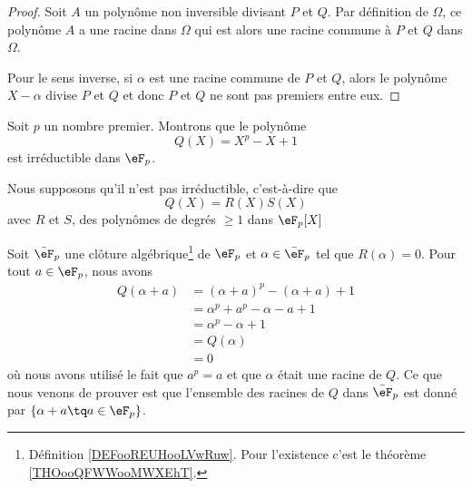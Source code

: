 \begin{proof}
    Soit \( A\) un polynôme non inversible divisant \( P\) et $Q$. Par définition de \( \Omega\), ce polynôme \( A\) a une racine dans \( \Omega\) qui est alors une racine commune à \( P\) et \( Q\) dans \( \Omega\).

    Pour le sens inverse, si \( \alpha\) est une racine commune de \( P\) et \( Q\), alors le polynôme \( X-\alpha\) divise \( P\) et \( Q\) et donc \( P\) et \( Q \) ne sont pas premiers entre eux.
\end{proof}

\begin{example}     \label{ExfUqQXQ}
    Soit \( p\) un nombre premier. Montrons que le polynôme
    \begin{equation}
        Q(X)=X^p-X+1
    \end{equation}
    est irréductible dans \( \eF_p\).

    Nous supposons qu'il n'est pas irréductible, c'est-à-dire que
    \begin{equation}
        Q(X)=R(X)S(X)
    \end{equation}
    avec \( R\) et \( S\), des polynômes de degrés \( \geq 1\) dans \( \eF_p[X]\)

    Soit \( \bar\eF_p\) une clôture algébrique\footnote{Définition \ref{DEFooREUHooLVwRuw}. Pour l'existence c'est le théorème \ref{THOooQFWWooMWXEhT}.} de \( \eF_p\) et \( \alpha\in \bar \eF_p\) tel que \( R(\alpha)=0\). Pour tout \( a\in \eF_p\), nous avons
    \begin{subequations}
        \begin{align}
            Q(\alpha+a)&=(\alpha+a)^p-(\alpha+a)+1\\
            &=\alpha^p+a^p-\alpha-a+1\\
            &=\alpha^p-\alpha+1\\
            &=Q(\alpha)\\
            &=0
        \end{align}
    \end{subequations}
    où nous avons utilisé le fait que \( a^p=a\) et que \( \alpha\) était une racine de \( Q\). Ce que nous venons de prouver est que l'ensemble des racines de \( Q\) dans \( \bar\eF_p\) est donné par \( \{ \alpha+a\tq a\in \eF_p \}\).


\end{example}
